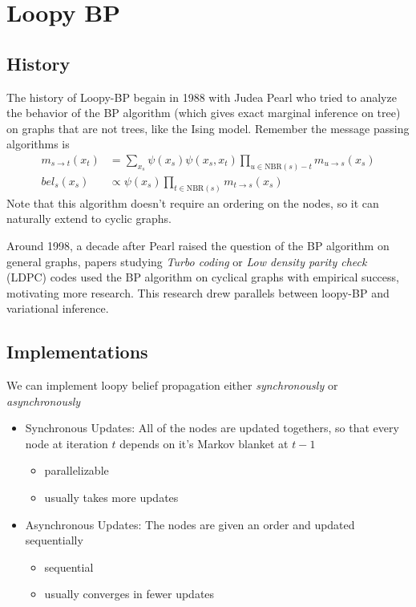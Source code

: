 \documentclass{article}
\begin{document}

\section{Loopy BP}
\subsection{History} The history of Loopy-BP begain in 1988 with Judea Pearl who tried to analyze the behavior of the BP algorithm (which gives exact marginal inference on tree) on graphs that are not trees, like the Ising model. Remember the message passing algorithms is
\begin{align*}
	m_{s\to t}(x_t) &= \sum_{x_s}\psi(x_s)\psi(x_s,x_t)\prod_{u\in \text{NBR}(s)-t}m_{u\to s}(x_s)\\
	bel_s(x_s) &\propto \psi(x_s)\prod_{t\in \text{NBR}(s)}m_{t\to s}(x_s)
\end{align*}
Note that this algorithm doesn't require an ordering on the nodes, so it can naturally extend to cyclic graphs.

Around 1998, a decade after Pearl raised the question of the BP algorithm on general graphs, papers studying \emph{Turbo coding} or \emph{Low density parity check} (LDPC) codes used the BP algorithm on cyclical graphs with empirical success, motivating more research. This research drew parallels between loopy-BP and variational inference.

\subsection{Implementations}
We can implement loopy belief propagation either \emph{synchronously} or \emph{asynchronously}
\begin{itemize}
	\item Synchronous Updates: All of the nodes are updated togethers, so that every node at iteration $t$ depends on it's Markov blanket at $t-1$
	\begin{itemize}
		\item parallelizable
		\item usually takes more updates
	\end{itemize}
	\item Asynchronous Updates: The nodes are given an order and updated sequentially
	\begin{itemize}
		\item sequential
		\item usually converges in fewer updates
	\end{itemize}
\end{itemize}
\end{document}
